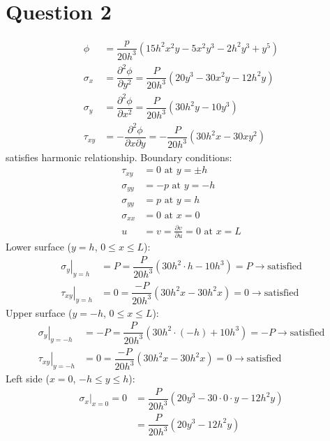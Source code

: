 \section{Question 2}
\begin{align}
    \phi      & = \dfrac{p}{20h^3} \left(15h^2x^2y-5x^2y^3-2h^2y^3+y^5\right)                                    \\
    \sigma_x  & = \dfrac{\partial^2 \phi}{\partial y^2} = \dfrac{P}{20h^3}\left(20y^3 -30x^2y-12h^2y\right)      \\
    \sigma_y  & = \dfrac{\partial^2 \phi}{\partial x^2} = \dfrac{P}{20h^3}\left(30h^2y-10y^3\right)              \\
    \tau_{xy} & = -\dfrac{\partial^2 \phi}{\partial x\partial y} = - \dfrac{P}{20h^3} \left(30h^2x-30xy^2\right)
\end{align}
satisfies harmonic relationship. Boundary conditions:
\begin{align}
    \tau_{xy}   & = 0 \textrm{ at } y = \pm h                                 \\
    \sigma_{yy} & = -p \textrm{ at } y = -h                                   \\
    \sigma_{yy} & = p \textrm{ at } y = h                                     \\
    \sigma_{xx} & = 0 \textrm{ at } x = 0                                     \\
    u           & = v = \frac{\partial v}{\partial u} = 0 \textrm{ at } x = L
\end{align}
Lower surface ($ y = h$, $0 \leq x \leq L$):
\begin{align}
    \left. \sigma_y \right|_{y=h}  & = P = \dfrac{P}{20h^3}\left(30h^2\cdot h - 10h^3\right) = P \rightarrow \textrm{satisfied} \\
    \left. \tau_{xy} \right|_{y=h} & = 0 = \dfrac{-P}{20h^3}\left(30h^2x - 30h^2x\right) = 0 \rightarrow \textrm{satisfied}
\end{align}
Upper surface ($ y = - h$, $0 \leq x \leq L$):
\begin{align}
    \left. \sigma_y\right|_{y=-h}   & = -P = \dfrac{P}{20h^3}\left( 30h^2\cdot \left( -h\right)+10h^3\right) = -P \rightarrow \textrm{satisfied} \\
    \left. \tau_{xy} \right|_{y=-h} & = 0 = \dfrac{-P}{20h^3} \left( 30h^2x - 30h^2x \right) = 0 \rightarrow \textrm{satisfied}
\end{align}
Left side ($ x = 0$, $-h \leq y \leq h$):
\begin{align}
    \left. \sigma_x \right|_{x=0} = 0 & = \dfrac{P}{20h^3}\left(20y^3 - 30\cdot 0 \cdot y - 12h^2 y\right) \\
                                      & =  \dfrac{P}{20h^3}\left(20y^3 - 12h^2 y\right)
\end{align}
